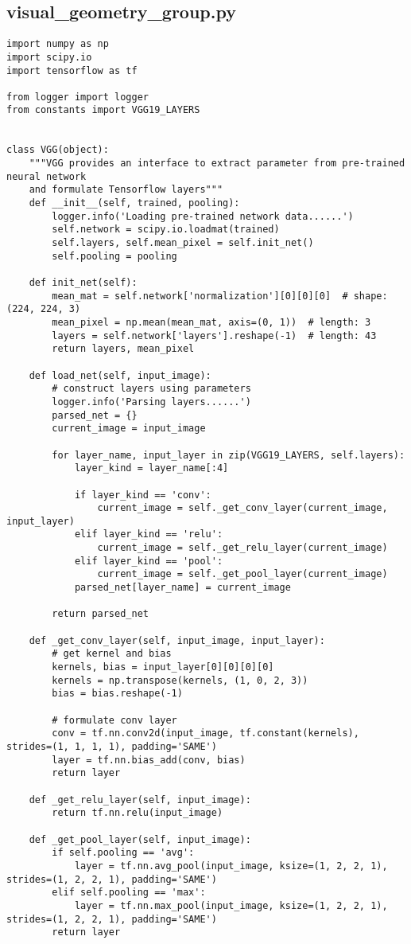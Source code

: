
\newpage
\begin{spacing}{1}
\section{visual\_geometry\_group.py}
\label{sec:code:vgg}
\begin{lstlisting}
import numpy as np
import scipy.io
import tensorflow as tf

from logger import logger
from constants import VGG19_LAYERS


class VGG(object):
    """VGG provides an interface to extract parameter from pre-trained neural network
    and formulate Tensorflow layers"""
    def __init__(self, trained, pooling):
        logger.info('Loading pre-trained network data......')
        self.network = scipy.io.loadmat(trained)
        self.layers, self.mean_pixel = self.init_net()
        self.pooling = pooling

    def init_net(self):
        mean_mat = self.network['normalization'][0][0][0]  # shape: (224, 224, 3)
        mean_pixel = np.mean(mean_mat, axis=(0, 1))  # length: 3
        layers = self.network['layers'].reshape(-1)  # length: 43
        return layers, mean_pixel

    def load_net(self, input_image):
        # construct layers using parameters
        logger.info('Parsing layers......')
        parsed_net = {}
        current_image = input_image

        for layer_name, input_layer in zip(VGG19_LAYERS, self.layers):
            layer_kind = layer_name[:4]

            if layer_kind == 'conv':
                current_image = self._get_conv_layer(current_image, input_layer)
            elif layer_kind == 'relu':
                current_image = self._get_relu_layer(current_image)
            elif layer_kind == 'pool':
                current_image = self._get_pool_layer(current_image)
            parsed_net[layer_name] = current_image

        return parsed_net

    def _get_conv_layer(self, input_image, input_layer):
        # get kernel and bias
        kernels, bias = input_layer[0][0][0][0]
        kernels = np.transpose(kernels, (1, 0, 2, 3))
        bias = bias.reshape(-1)

        # formulate conv layer
        conv = tf.nn.conv2d(input_image, tf.constant(kernels), strides=(1, 1, 1, 1), padding='SAME')
        layer = tf.nn.bias_add(conv, bias)
        return layer

    def _get_relu_layer(self, input_image):
        return tf.nn.relu(input_image)

    def _get_pool_layer(self, input_image):
        if self.pooling == 'avg':
            layer = tf.nn.avg_pool(input_image, ksize=(1, 2, 2, 1), strides=(1, 2, 2, 1), padding='SAME')
        elif self.pooling == 'max':
            layer = tf.nn.max_pool(input_image, ksize=(1, 2, 2, 1), strides=(1, 2, 2, 1), padding='SAME')
        return layer

\end{lstlisting}
\end{spacing}
